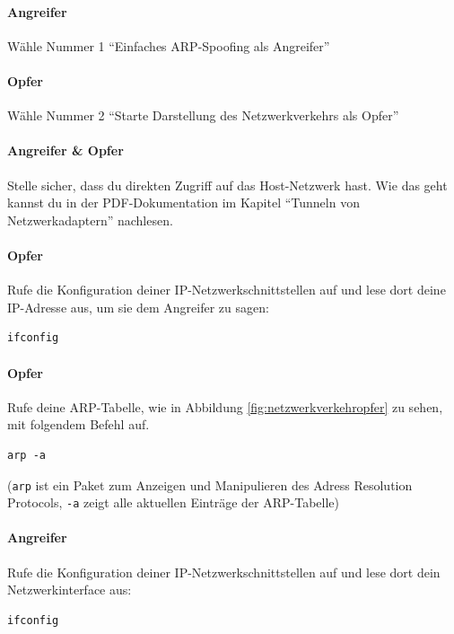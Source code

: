 \paragraph{Angreifer} Wähle Nummer 1 \enquote{Einfaches ARP-Spoofing als Angreifer}

\paragraph{Opfer} Wähle Nummer 2 \enquote{Starte Darstellung des Netzwerkverkehrs als Opfer}

\paragraph{Angreifer \& Opfer} Stelle sicher, dass du direkten Zugriff auf das Host-Netzwerk hast. Wie das geht kannst du in der PDF-Dokumentation im Kapitel \enquote{Tunneln von Netzwerkadaptern} nachlesen.

\paragraph{Opfer} Rufe die Konfiguration deiner IP-Netzwerkschnittstellen auf und lese dort deine IP-Adresse aus, um sie dem Angreifer zu sagen:
\begin{lstlisting}
ifconfig
\end{lstlisting}

\paragraph{Opfer} Rufe deine ARP-Tabelle, wie in Abbildung \ref{fig:netzwerkverkehropfer} zu sehen, mit folgendem Befehl auf.
\begin{lstlisting}
arp -a
\end{lstlisting}
(\colorbox{altgray}{\lstinline|arp|} ist ein Paket zum Anzeigen und Manipulieren des Adress Resolution Protocols, \colorbox{altgray}{\lstinline|-a|} zeigt alle aktuellen Einträge der ARP-Tabelle)

\paragraph{Angreifer} Rufe die Konfiguration deiner IP-Netzwerkschnittstellen auf und lese dort dein Netzwerkinterface aus:
\begin{lstlisting}
ifconfig
\end{lstlisting}

